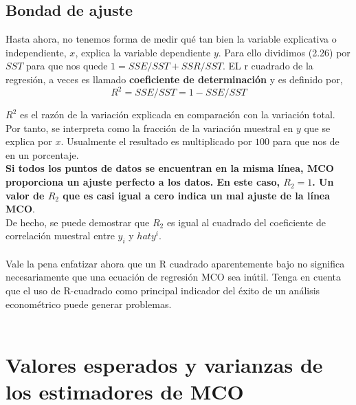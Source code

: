 \subsection{Bondad de ajuste}
Hasta ahora, no tenemos forma de medir qué tan bien la variable explicativa o independiente, $x$, explica la variable dependiente $y$. Para ello dividimos (2.26) por $SST$ para que nos quede $1=SSE/SST + SSR/SST$. EL r cuadrado de la regresión, a veces es llamado \textbf{coeficiente de determinación} y es definido por,
\begin{equation}
	R^2 = SSE/SST = 1 - SSE/SST
\end{equation}

$R^2$ es el razón de la variación explicada en comparación con la variación total. Por tanto, se interpreta como la fracción de la variación muestral en $y$ que se explica por $x$. Usualmente el resultado es multiplicado por $100$ para que nos de en un porcentaje.\\
\textbf{Si todos los puntos de datos se encuentran en la misma línea, MCO proporciona un ajuste perfecto a los datos. En este caso, $R_2 = 1$. Un valor de $R_2$ que es casi igual a cero indica un mal ajuste de la línea MCO}.\\
De hecho, se puede demostrar que $R_2$ es igual al cuadrado del coeficiente de correlación muestral entre $y_i$ y $hat{y}^i$.\\\\
Vale la pena enfatizar ahora que un R cuadrado aparentemente bajo no significa necesariamente que una ecuación de regresión MCO sea inútil. Tenga en cuenta que el uso de R-cuadrado como principal indicador del éxito de un análisis econométrico puede generar problemas.\\\\

\section{Valores esperados y varianzas de los estimadores de MCO}
